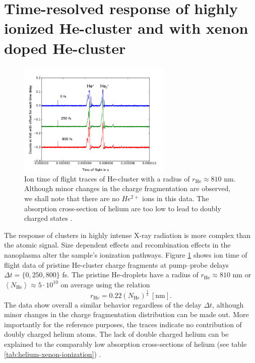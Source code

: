 \section{Time-resolved response of highly ionized He-cluster and with xenon doped He-cluster}
\begin{figure}
	\centering
		\includegraphics[width=0.65\textwidth]{images/results/TOF-helium-cluster.png}
	\caption{Ion time of flight traces of He-cluster with a radius of $r_{\text{He}}\approx 810$ nm. Although minor changes in the charge fragmentation are observed, we shall note that there are no $He^{2+}$ ions in this data. The absorption cross-section of helium are too low to lead to doubly charged states \citep{Ho-2016-PC}.}
	\label{fig:TOF-helium-cluster}
\end{figure}
The response of clusters in highly intense X-ray radiation is more complex than the atomic signal. Size dependent effects \citep{Schorb-2012-PRL,Schutte-2015-JPhysB} and recombination effects in the nanoplasma \citep{Schutte-2014-PRL} alter the sample's ionization pathways. Figure \ref{fig:TOF-helium-cluster} shows ion time of flight data of pristine He-cluster charge fragments at pump--probe delays $\Delta t=\{0, 250, 800\}$ fs. The pristine He-droplets have a radius of $r_{\text{He}}\approx 810$ nm or $\left\langle N_{\text{He}}\right\rangle\approx 5\cdot 10^{10}$ on average using the relation \citep{Gomez-2011-JCP}
\begin{equation}
r_{\text{He}}=0.22 (N_{\text{He}})^{\frac{1}{3}}\ [\text{nm}].
\end{equation}
The data show overall a similar behavior regardless of the delay $\Delta t$, although minor changes in the charge fragmentation distribution can be made out. More importantly for the reference purposes, the traces indicate no contribution of doubly charged helium atoms. The lack of double charged helium can be explained to the comparably low absorption cross-sections of helium (see table \ref{tab:helium-xenon-ionization}) \citep{Ho-2016-PC}.\\
